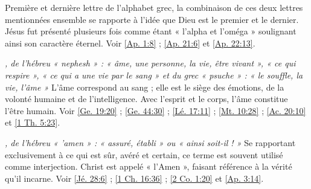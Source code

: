 \begin{multicols}{2}
\textit{}\newline
Première et dernière lettre de l'alphabet grec, la combinaison de ces deux lettres mentionnées ensemble se rapporte à l'idée que Dieu est le premier et le dernier. Jésus fut présenté plusieurs fois comme étant « l'alpha et l'oméga » soulignant ainsi son caractère éternel. Voir \vref{Ap. 1:8} ; \vref{Ap. 21:6} et \vref{Ap. 22:13}.

\textit{, de l'hébreu « nephesh » : « âme, une personne, la vie, être vivant », « ce qui respire », « ce qui a une vie par le sang » et du grec « psuche » : « le souffle, la vie, l'âme »}\newline
L'âme correspond au sang ; elle est le siège des émotions, de la volonté humaine et de l'intelligence. Avec l'esprit et le corps, l'âme constitue l'être humain. Voir \vref{Ge. 19:20} ; \vref{Ge. 44:30} ; \vref{Lé. 17:11} ; \vref{Mt. 10:28} ; \vref{Ac. 20:10} et \vref{1 Th. 5:23}.

\textit{, de l'hébreu « 'amen » : « assuré, établi » ou « ainsi soit-il ! »}\newline
Se rapportant exclusivement à ce qui est sûr, avéré et certain, ce terme est souvent utilisé comme interjection. Christ est appelé « l'Amen », faisant référence à la vérité qu'il incarne. Voir \vref{Jé. 28:6} ; \vref{1 Ch. 16:36} ; \vref{2 Co. 1:20} et \vref{Ap. 3:14}.


\end{multicols}
